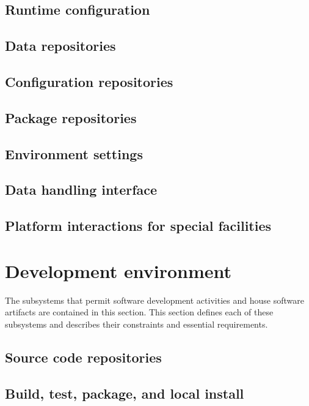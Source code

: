 \documentclass[draftmode,draftwater]{memarticle}
\begin{document}
\subsection{Runtime configuration}

\subsection{Data repositories}

\subsection{Configuration repositories}

\subsection{Package repositories}

\subsection{Environment settings}

\subsection{Data handling interface}

\subsection{Platform interactions for special facilities}

\section{Development environment}

The subsystems that permit software development activities and house
software artifacts are contained in this section. This section defines
each of these subsystems and describes their constraints and essential
requirements.


\subsection{Source code repositories}

\subsection{Build, test, package, and local install}
\end{document}
